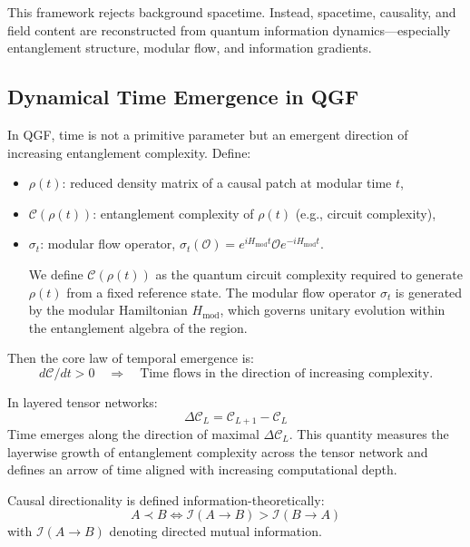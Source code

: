 \documentclass[11pt]{article}
\def\frac#1#2{#1/#2}
\begin{document}
This framework rejects background spacetime. Instead, spacetime, causality, and field content are reconstructed from quantum information dynamics—especially entanglement structure, modular flow, and information gradients.

\subsection{Dynamical Time Emergence in QGF}

In QGF, time is not a primitive parameter but an emergent direction of increasing entanglement complexity. Define:
\begin{itemize}
    \item $\rho(t)$: reduced density matrix of a causal patch at modular time $t$,
    \item $\mathcal{C}(\rho(t))$: entanglement complexity of $\rho(t)$ (e.g., circuit complexity),
    \item $\sigma_t$: modular flow operator, $\sigma_t(\mathcal{O}) = e^{i H_{\text{mod}} t} \mathcal{O} e^{-i H_{\text{mod}} t}$.

We define $\mathcal{C}(\rho(t))$ as the quantum circuit complexity required to generate $\rho(t)$ from a fixed reference state. The modular flow operator $\sigma_t$ is generated by the modular Hamiltonian $H_{\text{mod}}$, which governs unitary evolution within the entanglement algebra of the region.

\end{itemize}

Then the core law of temporal emergence is:
\begin{equation}
\frac{d\mathcal{C}}{dt} > 0 \quad \Rightarrow \quad \text{Time flows in the direction of increasing complexity.}
\end{equation}

In layered tensor networks:
\begin{equation}
\Delta \mathcal{C}_L = \mathcal{C}_{L+1} - \mathcal{C}_L
\end{equation}
Time emerges along the direction of maximal $\Delta \mathcal{C}_L$.
This quantity measures the layerwise growth of entanglement complexity across the tensor network and defines an arrow of time aligned with increasing computational depth.


Causal directionality is defined information-theoretically:
\begin{equation}
A \prec B \iff \mathcal{I}(A \rightarrow B) > \mathcal{I}(B \rightarrow A)
\end{equation}
with $\mathcal{I}(A \rightarrow B)$ denoting directed mutual information.
\end{document}
